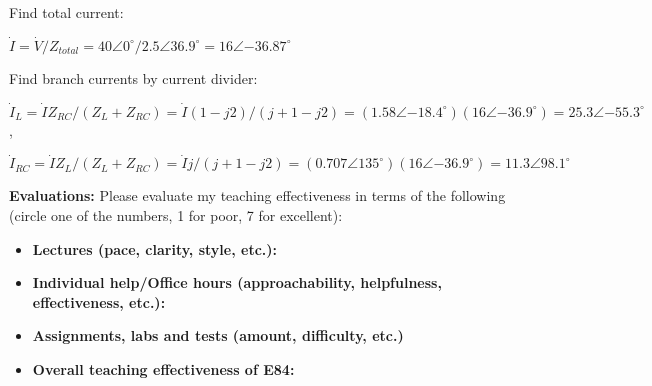 \begin{enumerate}
Find total current:

$\dot{I}=\dot{V}/Z_{total}=40\angle{0^\circ}/2.5\angle{36.9^\circ}
=16\angle{-36.87^\circ}$

Find branch currents by current divider:

 $\dot{I}_L=\dot{I} Z_{RC}/(Z_L+Z_{RC})=\dot{I} (1-j2)/(j+1-j2)
 =(1.58\angle{-18.4^\circ})(16\angle{-36.9^\circ})
 =25.3\angle{-55.3^\circ}$,

 $\dot{I}_{RC}=\dot{I} Z_L/(Z_L+Z_{RC})=\dot{I} j/(j+1-j2)
 =(0.707\angle{135^\circ})(16\angle{-36.9^\circ})
 =11.3\angle{98.1^\circ}$

\end{enumerate}




\item {\bf Evaluations:} Please evaluate my teaching effectiveness in terms 
of the following (circle one of the numbers, 1 for poor, 7 for excellent):

\begin{itemize}
\item {\bf Lectures (pace, clarity, style, etc.):}


\item {\bf Individual help/Office hours (approachability, helpfulness, effectiveness, etc.):}


\item {\bf Assignments, labs and tests (amount, difficulty, etc.)}


\item {\bf Overall teaching effectiveness of E84:} 


\end{itemize}

